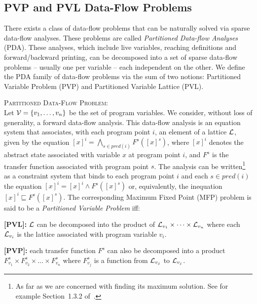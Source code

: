 \subsection{PVP and PVL Data-Flow Problems}
\label{sec:ssi:pereira:pvpPvl}

There exists a class of data-flow problems that can be naturally solved via sparse data-flow analyses.
These problems are called {\em Partitioned Data-flow Analyses} (PDA).
These analyses, which include live variables, reaching definitions and forward/backward printing, can be decomposed into a set of sparse data-flow problems -- usually one per variable -- each independent on the other.
We define the PDA family of data-flow problems via the sum of two notions: Partitioned Variable Problem (PVP) and Partitioned Variable Lattice (PVL).

\begin{definition}
\label{pro:pvp}
\textsc{Partitioned Data-Flow Problem}:\\Let ${\cal V}=\{v_1,\dots,v_n\}$ be the set of program variables.
We consider, without loss of generality, a forward data-flow analysis.
This data-flow analysis is an equation system that associates, with each program point $i$, an element of a lattice ${\cal L}$, given by the equation $[x]^i = \bigwedge_{s \in \mathit{pred}(i)} F^s([x]^s)$, where $[x]^i$ denotes the abstract state associated with variable $x$ at program point $i$, and $F^s$ is the transfer function associated with program point $s$.
The analysis can be written\footnote{As far as we are concerned with finding its maximum solution. See for example Section~1.3.2 of~\cite{Nielson05}.} as a constraint system that binds to each program point $i$ and each $s\in \mathit{pred}(i)$ the equation $[x]^i = [x]^i \wedge  F^s([x]^s)$ or, equivalently, the inequation $[x]^i \sqsubseteq  F^s([x]^s)$.
The corresponding Maximum Fixed Point (MFP) problem is said to be a \emph{Partitioned Variable Problem} iff:
\begin{description}
\item {\bf [PVL]:} $\cal L$ can be decomposed into the product of ${\cal L}_{v_1}\times \dots \times {\cal L}_{v_n}$ where each ${\cal L}_{v_i}$ is the lattice associated with program variable $v_i$.
\item {\bf [PVP]:} each transfer function $F^s$ can also be decomposed into a product $F_{v_1}^s\times F_{v_2}^s \times \dots \times F_{v_n}^s$ where $F_{v_j}^s$ is a function from ${\cal L}_{v_j}$ to ${\cal L}_{v_j}$.
\end{description}
\end{definition}


